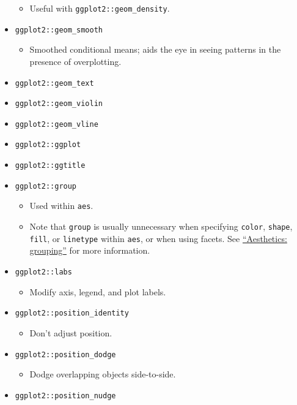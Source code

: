 \documentclass[
]{book}
\providecommand{\tightlist}{%
  \setlength{\itemsep}{0pt}\setlength{\parskip}{0pt}}
\begin{document}
\begin{itemize}
  \begin{itemize}
  \tightlist
  \item
    Useful with \texttt{ggplot2::geom\_density}.
  \end{itemize}
\item
  \texttt{ggplot2::geom\_smooth}

  \begin{itemize}
  \tightlist
  \item
    Smoothed conditional means; aids the eye in seeing patterns in the presence of overplotting.
  \end{itemize}
\item
  \texttt{ggplot2::geom\_text}
\item
  \texttt{ggplot2::geom\_violin}
\item
  \texttt{ggplot2::geom\_vline}
\item
  \texttt{ggplot2::ggplot}
\item
  \texttt{ggplot2::ggtitle}
\item
  \texttt{ggplot2::group}

  \begin{itemize}
  \tightlist
  \item
    Used within \texttt{aes}.
  \item
    Note that \texttt{group} is usually unnecessary when specifying \texttt{color}, \texttt{shape}, \texttt{fill}, or \texttt{linetype} within \texttt{aes}, or when using facets. See \href{https://ggplot2.tidyverse.org/reference/aes_group_order.html}{``Aesthetics: grouping''} for more information.
  \end{itemize}
\item
  \texttt{ggplot2::labs}

  \begin{itemize}
  \tightlist
  \item
    Modify axis, legend, and plot labels.
  \end{itemize}
\item
  \texttt{ggplot2::position\_identity}

  \begin{itemize}
  \tightlist
  \item
    Don't adjust position.
  \end{itemize}
\item
  \texttt{ggplot2::position\_dodge}

  \begin{itemize}
  \tightlist
  \item
    Dodge overlapping objects side-to-side.
  \end{itemize}
\item
  \texttt{ggplot2::position\_nudge}


\end{itemize}
\end{document}
